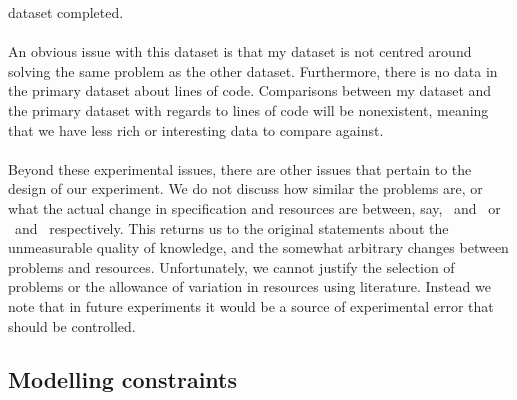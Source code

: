 dataset completed.\\
\\
An obvious issue with this dataset is that my dataset is not centred around
solving the same problem as the other dataset.
Furthermore, there is no data in the primary dataset about lines of code.
Comparisons between my dataset and the primary dataset with regards to lines of
code will be nonexistent, meaning that we have less rich or interesting data to
compare against.\\
\\
Beyond these experimental issues, there are other issues that pertain to
the design of our experiment.
We do not discuss how similar the problems are, or what the actual change in
specification and resources are between, say, \PO\ and \PT\ or \LA\ and \LB\ 
respectively.
This returns us to the original statements about the unmeasurable quality of
knowledge, and the somewhat arbitrary changes between problems and resources.
Unfortunately, we cannot justify the selection of problems or the allowance of
variation in resources using literature.
Instead we note that in future experiments it would be a source of experimental
error that should be controlled.

\subsection{Modelling constraints} \label{subsecModelling}

